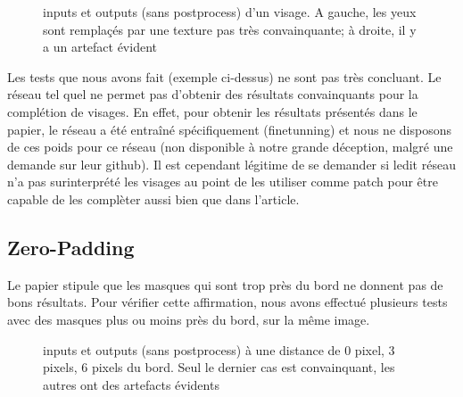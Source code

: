 \documentclass[12pt]{article}
\begin{document}
\begin{figure}[htb]
\centering
  \hfill
  \hfill
  \hfill
  \hfill
  \caption{inputs et outputs (sans postprocess) d'un visage. A gauche, les yeux sont remplaçés par une texture pas très convainquante; à droite, il y a un artefact évident}\label{fig:occlus_dynamic}
\end{figure}

Les tests que nous avons fait (exemple ci-dessus) ne sont pas très
concluant. Le réseau tel quel ne permet pas d'obtenir des résultats
convainquants pour la complétion de visages. En effet, pour obtenir
les résultats présentés dans le papier, le réseau a été entraîné
spécifiquement (finetunning) et nous ne disposons de ces poids pour ce
réseau (non disponible à notre grande déception, malgré une demande sur leur github). Il est cependant légitime de se demander si ledit réseau n'a pas surinterprété les visages au point de les utiliser comme patch pour être capable de les complèter aussi bien que dans l'article.

\subsection{Zero-Padding}

Le papier stipule que les masques qui sont trop près du bord ne donnent pas de bons résultats. Pour vérifier cette affirmation, nous avons effectué plusieurs tests avec des masques plus ou moins près du bord, sur la même image.

\begin{figure}[htb]
\centering
  \hfill
  \hfill
  \hfill
\end{figure}
\begin{figure}[htb]
\centering
  \hfill
  \hfill
  \hfill
  \caption{inputs et outputs (sans postprocess) à une distance de 0 pixel, 3 pixels, 6 pixels du bord. Seul le dernier cas est convainquant, les autres ont des artefacts évidents}\label{fig:occlus_dynamic}
\end{figure}
\end{document}
